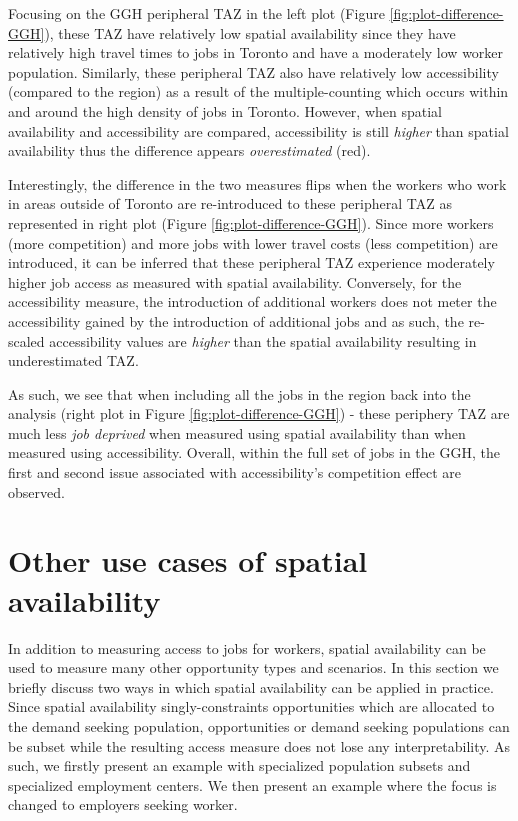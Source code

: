 \documentclass[]{elsarticle} %
\begin{document}
Focusing on the GGH peripheral TAZ in the left plot (Figure
\ref{fig:plot-difference-GGH}), these TAZ have relatively low spatial
availability since they have relatively high travel times to jobs in
Toronto and have a moderately low worker population. Similarly, these
peripheral TAZ also have relatively low accessibility (compared to the
region) as a result of the multiple-counting which occurs within and
around the high density of jobs in Toronto. However, when spatial
availability and accessibility are compared, accessibility is still
\emph{higher} than spatial availability thus the difference appears
\emph{overestimated} (red).

Interestingly, the difference in the two measures flips when the workers
who work in areas outside of Toronto are re-introduced to these
peripheral TAZ as represented in right plot (Figure
\ref{fig:plot-difference-GGH}). Since more workers (more competition)
and more jobs with lower travel costs (less competition) are introduced,
it can be inferred that these peripheral TAZ experience moderately
higher job access as measured with spatial availability. Conversely, for
the accessibility measure, the introduction of additional workers does
not meter the accessibility gained by the introduction of additional
jobs and as such, the re-scaled accessibility values are \emph{higher}
than the spatial availability resulting in underestimated TAZ.

As such, we see that when including all the jobs in the region back into
the analysis (right plot in Figure \ref{fig:plot-difference-GGH}) -
these periphery TAZ are much less \emph{job deprived} when measured
using spatial availability than when measured using accessibility.
Overall, within the full set of jobs in the GGH, the first and second
issue associated with accessibility's competition effect are observed.

\hypertarget{other-use-cases-of-spatial-availability}{%
\section{Other use cases of spatial
availability}\label{other-use-cases-of-spatial-availability}}

In addition to measuring access to jobs for workers, spatial
availability can be used to measure many other opportunity types and
scenarios. In this section we briefly discuss two ways in which spatial
availability can be applied in practice. Since spatial availability
singly-constraints opportunities which are allocated to the demand
seeking population, opportunities or demand seeking populations can be
subset while the resulting access measure does not lose any
interpretability. As such, we firstly present an example with
specialized population subsets and specialized employment centers. We
then present an example where the focus is changed to employers seeking
worker.
\end{document}

